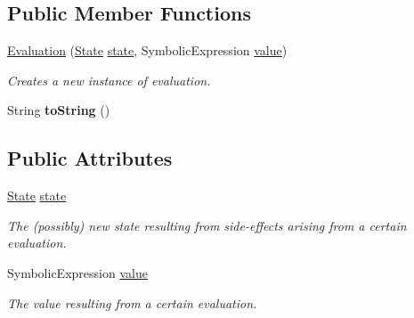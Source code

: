 \subsection*{Public Member Functions}
\begin{DoxyCompactItemize}
\item 
\hyperlink{classedu_1_1udel_1_1cis_1_1vsl_1_1civl_1_1semantics_1_1IF_1_1Evaluation_a9c8eae1ca7539cb19703d14905766603}{Evaluation} (\hyperlink{interfaceedu_1_1udel_1_1cis_1_1vsl_1_1civl_1_1state_1_1IF_1_1State}{State} \hyperlink{classedu_1_1udel_1_1cis_1_1vsl_1_1civl_1_1semantics_1_1IF_1_1Evaluation_a012799bd256de21c77938837465893a7}{state}, Symbolic\+Expression \hyperlink{classedu_1_1udel_1_1cis_1_1vsl_1_1civl_1_1semantics_1_1IF_1_1Evaluation_ac1e626eed519c2f77d8496258c9ada86}{value})
\begin{DoxyCompactList}\small\item\em Creates a new instance of evaluation. \end{DoxyCompactList}\item 
\hypertarget{classedu_1_1udel_1_1cis_1_1vsl_1_1civl_1_1semantics_1_1IF_1_1Evaluation_a6cc25afd1c68d9db080ba1875234cbfc}{}String {\bfseries to\+String} ()\label{classedu_1_1udel_1_1cis_1_1vsl_1_1civl_1_1semantics_1_1IF_1_1Evaluation_a6cc25afd1c68d9db080ba1875234cbfc}

\end{DoxyCompactItemize}
\subsection*{Public Attributes}
\begin{DoxyCompactItemize}
\item 
\hypertarget{classedu_1_1udel_1_1cis_1_1vsl_1_1civl_1_1semantics_1_1IF_1_1Evaluation_a012799bd256de21c77938837465893a7}{}\hyperlink{interfaceedu_1_1udel_1_1cis_1_1vsl_1_1civl_1_1state_1_1IF_1_1State}{State} \hyperlink{classedu_1_1udel_1_1cis_1_1vsl_1_1civl_1_1semantics_1_1IF_1_1Evaluation_a012799bd256de21c77938837465893a7}{state}\label{classedu_1_1udel_1_1cis_1_1vsl_1_1civl_1_1semantics_1_1IF_1_1Evaluation_a012799bd256de21c77938837465893a7}

\begin{DoxyCompactList}\small\item\em The (possibly) new state resulting from side-\/effects arising from a certain evaluation. \end{DoxyCompactList}\item 
\hypertarget{classedu_1_1udel_1_1cis_1_1vsl_1_1civl_1_1semantics_1_1IF_1_1Evaluation_ac1e626eed519c2f77d8496258c9ada86}{}Symbolic\+Expression \hyperlink{classedu_1_1udel_1_1cis_1_1vsl_1_1civl_1_1semantics_1_1IF_1_1Evaluation_ac1e626eed519c2f77d8496258c9ada86}{value}\label{classedu_1_1udel_1_1cis_1_1vsl_1_1civl_1_1semantics_1_1IF_1_1Evaluation_ac1e626eed519c2f77d8496258c9ada86}

\begin{DoxyCompactList}\small\item\em The value resulting from a certain evaluation. \end{DoxyCompactList}\end{DoxyCompactItemize}


